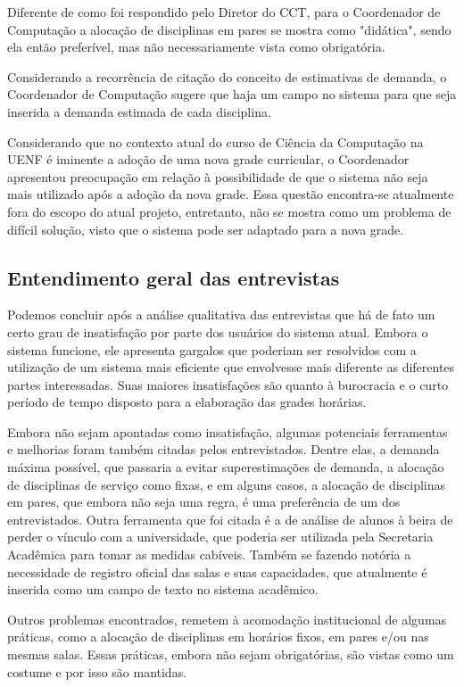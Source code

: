 Diferente de como foi respondido pelo Diretor do CCT, para o Coordenador de Computação a alocação de disciplinas em pares se mostra como "didática", sendo ela então preferível, mas não necessariamente vista como obrigatória.

Considerando a recorrência de citação do conceito de estimativas de demanda, o Coordenador de Computação sugere que haja um campo no sistema para que seja inserida a demanda estimada de cada disciplina.

Considerando que no contexto atual do curso de Ciência da Computação na UENF é iminente a adoção de uma nova grade curricular, o Coordenador apresentou preocupação em relação à possibilidade de que o sistema não seja mais utilizado após a adoção da nova grade. Essa questão encontra-se atualmente fora do escopo do atual projeto, entretanto, não se mostra como um problema de difícil solução, visto que o sistema pode ser adaptado para a nova grade.

\subsection{Entendimento geral das entrevistas} %

Podemos concluir após a análise qualitativa das entrevistas que há de fato um certo grau de insatisfação por parte dos usuários do sistema atual. Embora o sistema funcione, ele apresenta gargalos que poderiam ser resolvidos com a utilização de um sistema mais eficiente que envolvesse mais diferente as diferentes partes interessadas. Suas maiores insatisfações são quanto à burocracia e o curto período de tempo disposto para a elaboração das grades horárias.

Embora não sejam apontadas como insatisfação, algumas potenciais ferramentas e melhorias foram também citadas pelos entrevistados. Dentre elas, a demanda máxima possível, que passaria a evitar superestimações de demanda, a alocação de disciplinas de serviço como fixas, e em alguns casos, a alocação de disciplinas em pares, que embora não seja uma regra, é uma preferência de um dos entrevistados. Outra ferramenta que foi citada é a de análise de alunos à beira de perder o vínculo com a universidade, que poderia ser utilizada pela Secretaria Acadêmica para tomar as medidas cabíveis. Também se fazendo notória a necessidade de registro oficial das salas e suas capacidades, que atualmente é inserida como um campo de texto no sistema acadêmico.

Outros problemas encontrados, remetem à acomodação institucional de algumas práticas, como a alocação de disciplinas em horários fixos, em pares e/ou nas mesmas salas. Essas práticas, embora não sejam obrigatórias, são vistas como um costume e por isso são mantidas.

